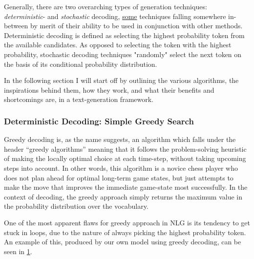 Generally, there are two overarching types of generation techniques: \textit{deterministic}- and \textit{stochastic} decoding, \hyperref[sec:det-simple]{some} techniques falling somewhere in-between by merit of their ability to be used in conjunction with other methods. Deterministic decoding is defined as selecting the highest probability token from the available candidates. As opposed to selecting the token with the highest probability, stochastic decoding techniques "randomly" select the next token on the basis of its conditional probability distribution.

In the following section I will start off by outlining the various algorithms, the inspirations behind them, how they work, and what their benefits and shortcomings are, in a text-generation framework.

\subsubsection{Deterministic Decoding: Simple Greedy Search}
\label{sec:det-simple}
Greedy decoding is, as the name suggests, an algorithm which falls under the header “greedy algorithms” meaning that it follows the problem-solving heuristic of making the locally optimal choice at each time-step, without taking upcoming steps into account. In other words, this algorithm is a novice chess player who does not plan ahead for optimal long-term game states, but just attempts to make the move that improves the immediate game-state most successfully. In the context of decoding, the greedy approach simply returns the maximum value in the probability distribution over the vocabulary.

One of the most apparent flaws for greedy approach in NLG is its tendency to get stuck in loops, due to the nature of always picking the highest probability token. An example of this, produced by our own model using greedy decoding, can be seen in \cref{fig:greedyrepeat}.

\begin{figure}[H]
\centering
\captionsetup{width=1\linewidth, position=bottom}
{\setlength{\fboxsep}{10pt}
\label{fig:greedyrepeat}}
\end{figure}


